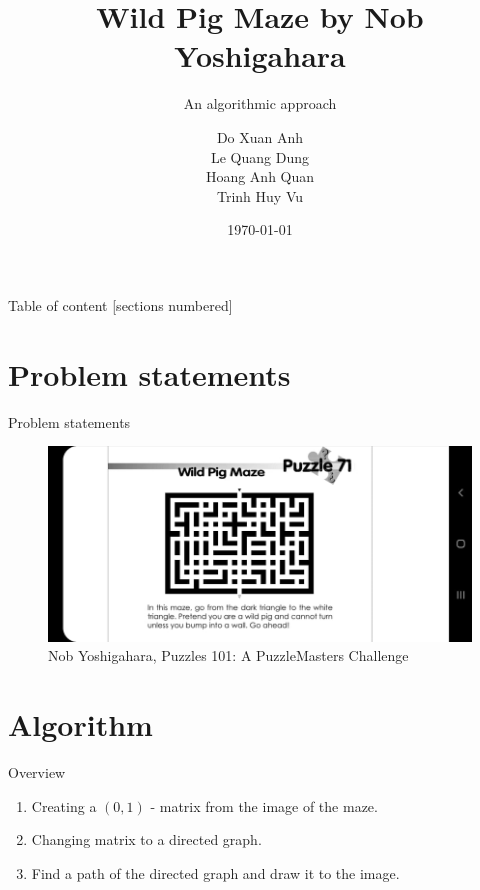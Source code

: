 \documentclass[10pt]{beamer}
\title[Wild Pig Maze title]{Wild Pig Maze by Nob Yoshigahara}
\subtitle{An algorithmic approach}
\date{\today}
\author[shortname]{
  Do Xuan Anh \\ %
  Le Quang Dung \\ %
  Hoang Anh Quan \\ %
  Trinh Huy Vu \\ %
  }
\begin{document}
\begin{frame}
	\maketitle
\end{frame}

\begin{frame}{Table of content}
	[sections numbered]
	\tableofcontents[hideallsubsections]
\end{frame}

\section{Problem statements}

\begin{frame}{Problem statements}
  \begin{figure}[htb!] %
    \centering
    \includegraphics[trim={3cm 0cm 3cm 0cm},clip,scale=0.4]{../images/input_image.jpg}
    \caption{Nob Yoshigahara, Puzzles 101: A PuzzleMasters Challenge}
    \label{fig:} %
  \end{figure}
\end{frame}

\section{Algorithm}

\begin{frame}{Overview}
  \begin{enumerate}
    \item Creating a $(0, 1)$ - matrix from the image of the maze.
    \item Changing matrix to a directed graph.
    \item Find a path of the directed graph and draw it to the image.
  \end{enumerate}
\end{frame}
\end{document}
